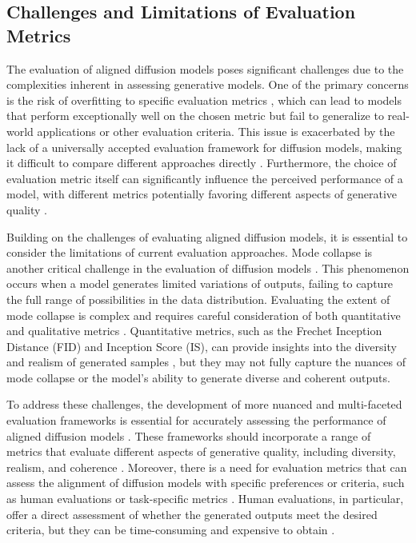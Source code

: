 \documentclass[11pt,a4paper]{article}
\begin{document}
\subsection{Challenges and Limitations of Evaluation Metrics}


The evaluation of aligned diffusion models poses significant challenges due to the complexities inherent in assessing generative models. One of the primary concerns is the risk of overfitting to specific evaluation metrics \cite{doi:10.1162/089120103321337421}, which can lead to models that perform exceptionally well on the chosen metric but fail to generalize to real-world applications or other evaluation criteria. This issue is exacerbated by the lack of a universally accepted evaluation framework for diffusion models, making it difficult to compare different approaches directly \cite{doi:10.1109/ichi.2017.57}. Furthermore, the choice of evaluation metric itself can significantly influence the perceived performance of a model, with different metrics potentially favoring different aspects of generative quality \cite{doi:10.1093/bioinformatics/btz576}.

Building on the challenges of evaluating aligned diffusion models, it is essential to consider the limitations of current evaluation approaches. Mode collapse is another critical challenge in the evaluation of diffusion models \cite{doi:10.1145/3626235}. This phenomenon occurs when a model generates limited variations of outputs, failing to capture the full range of possibilities in the data distribution. Evaluating the extent of mode collapse is complex and requires careful consideration of both quantitative and qualitative metrics \cite{doi:10.1109/tkde.2024.3361474}. Quantitative metrics, such as the Frechet Inception Distance (FID) and Inception Score (IS), can provide insights into the diversity and realism of generated samples \cite{arxiv:2210.09292}, but they may not fully capture the nuances of mode collapse or the model's ability to generate diverse and coherent outputs.

To address these challenges, the development of more nuanced and multi-faceted evaluation frameworks is essential for accurately assessing the performance of aligned diffusion models \cite{arxiv:2303.07576}. These frameworks should incorporate a range of metrics that evaluate different aspects of generative quality, including diversity, realism, and coherence \cite{arxiv:2106.00132}. Moreover, there is a need for evaluation metrics that can assess the alignment of diffusion models with specific preferences or criteria, such as human evaluations or task-specific metrics \cite{arxiv:2305.13301}. Human evaluations, in particular, offer a direct assessment of whether the generated outputs meet the desired criteria, but they can be time-consuming and expensive to obtain \cite{arxiv:2410.02543}.
\end{document}
